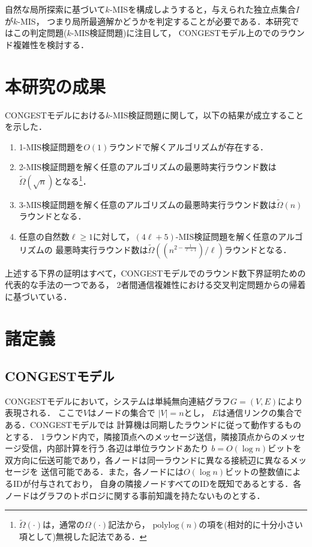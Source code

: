\documentclass[a4j,twoside]{jarticle}
\newcommand{\CONGEST}{\textsf{CONGEST}}
\theoremstyle{definition}
\begin{document}
\begin{論文概要}
自然な局所探索に基づいて$k$-MISを構成しようすると，与えられた独立点集合$I$が$k$-MIS，
つまり局所最適解かどうかを判定することが必要である．本研究ではこの判定問題($k$-MIS検証問題)に注目して，
{\CONGEST}モデル上のでのラウンド複雑性を検討する．

\section{本研究の成果}
{\CONGEST}モデルにおける$k$-MIS検証問題に関して，以下の結果が成立することを示した．
\begin{enumerate}
\item 1-MIS検証問題を$O(1)$ラウンドで解くアルゴリズムが存在する．
\item 2-MIS検証問題を解く任意のアルゴリズムの最悪時実行ラウンド数は$\tilde{\Omega} (\sqrt{n})$となる\footnote{$\tilde{\Omega}(\cdot)$は，通常の$\Omega(\cdot)$記法から，
$\mathrm{polylog}(n)$の項を(相対的に十分小さい項として)無視した記法である．}．
\item 3-MIS検証問題を解く任意のアルゴリズムの最悪時実行ラウンド数は$\tilde{\Omega}(n)$ラウンドとなる．
\item 任意の自然数$\ell \geq 1$に対して，$(4\ell + 5)$-MIS検証問題を解く任意のアルゴリズムの
最悪時実行ラウンド数は$\tilde{\Omega}\left((n^{2 - \frac{1}{\ell+1}})/\ell\right)$ラウンドとなる．
\end{enumerate}

上述する下界の証明はすべて，{\CONGEST}モデルでのラウンド数下界証明ための代表的な手法の一つである，
2者間通信複雑性における交叉判定問題からの帰着に基づいている．

\section{諸定義}
\subsection{{\CONGEST}モデル}
{\CONGEST}モデルにおいて，システムは単純無向連結グラフ$G =  (V,E)$により表現される．
ここで$V$はノードの集合で $|V| = n$とし， $E$は通信リンクの集合である．{\CONGEST}モデルでは
計算機は同期したラウンドに従って動作するものとする．
1ラウンド内で，隣接頂点へのメッセージ送信，隣接頂点からのメッセージ受信，内部計算を行う.各辺は単位ラウンドあたり
$b = O(\log n)$ビットを双方向に伝送可能であり，各ノードは同一ラウンドに異なる接続辺に異なるメッセージを
送信可能である．また，各ノードには$O(\log n)$ビットの整数値によるIDが付与されており，
自身の隣接ノードすべてのIDを既知であるとする．各ノードはグラフのトポロジに関する事前知識を持たないものとする．


\end{論文概要}
\end{document}

